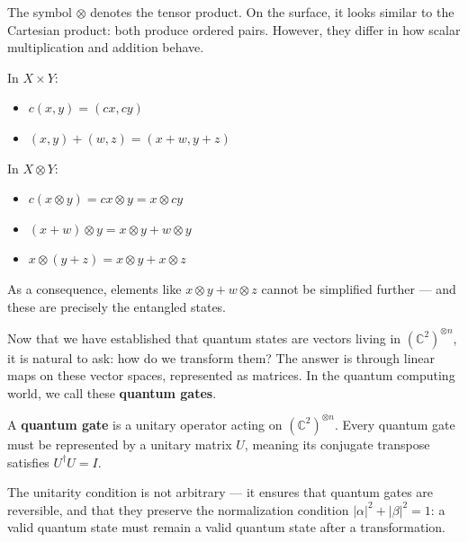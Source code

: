 \begin{smjnote}
The symbol $\otimes$ denotes the tensor product. On the surface, it looks
similar to the Cartesian product: both produce ordered pairs. However, they
differ in how scalar multiplication and addition behave.

In $X \times Y$:
\begin{itemize}
    \item $c(x, y) = (cx, cy)$
    \item $(x, y) + (w, z) = (x+w, y+z)$
\end{itemize}
In $X \otimes Y$:
\begin{itemize}
    \item $c(x \otimes y) = cx \otimes y = x \otimes cy$
    \item $(x + w) \otimes y = x \otimes y + w \otimes y$
    \item $x \otimes (y + z) = x \otimes y + x \otimes z$
\end{itemize}
As a consequence, elements like $x \otimes y + w \otimes z$ cannot be
simplified further --- and these are precisely the entangled states.
\end{smjnote}

Now that we have established that quantum states are vectors living in
$(\mathbb{C}^2)^{\otimes n}$, it is natural to ask: how do we transform them?
The answer is through linear maps on these vector spaces, represented as
matrices. In the quantum computing world, we call these \textbf{quantum gates}.

\begin{smjdefinition}
A \textbf{quantum gate} is a unitary operator acting on
$(\mathbb{C}^2)^{\otimes n}$. Every quantum gate must be represented by a
unitary matrix $U$, meaning its conjugate transpose satisfies $U^\dagger U = I$.
\end{smjdefinition}

The unitarity condition is not arbitrary --- it ensures that quantum gates are
reversible, and that they preserve the normalization condition
$|\alpha|^2 + |\beta|^2 = 1$: a valid quantum state must remain a valid
quantum state after a transformation.

